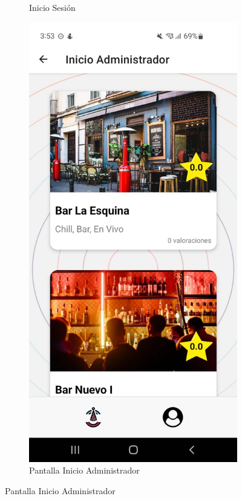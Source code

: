 \begin{figure}[H]
\begin{subfigure}{0.45\textwidth}
        \caption{Inicio Sesión}
        \label{fig:img5}
    \end{subfigure}%
    \hfill
    \begin{subfigure}{0.45\textwidth}
        \centering
        \includegraphics[width=\linewidth]{imagenes/Capturas/InicioAdmin.jpeg}
        \caption{Pantalla Inicio Administrador}
        \label{fig:img6}
    \end{subfigure}
\end{figure}
\vspace*{\fill}

